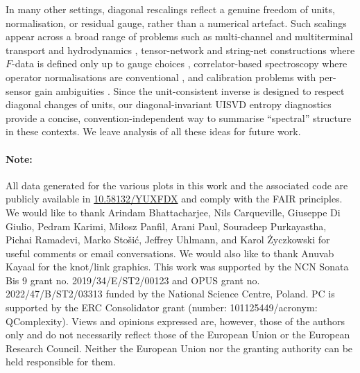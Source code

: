 \documentclass[11pt,a4paper]{article}
\begin{document}
In many other settings, diagonal rescalings reflect a genuine freedom of units, normalisation, or residual gauge, rather than a numerical artefact. Such scalings appear across a broad range of problems such as multi-channel and multiterminal transport and hydrodynamics \cite{Lucas2015HydrodynamicTransport,BrandnerSeifert2013Multiterminal,JacquodWhitneyMeairButtiker2012Tenfold,LucasDavisonSachdev2016WeylHydro}, tensor-network and string-net constructions where $F$-data is defined only up to gauge choices \cite{LevinWen2004StringNet,LanWen2013BulkEdgeStringNet,FrancuzLootensVerstraeteDziarmaga2021VariationalMPO}, correlator-based spectroscopy where operator normalisations are conventional \cite{DetmoldEndres2015SignalNoise,BlossierDellaMorteVonHippelMendesSommer2009GEVP}, and calibration problems with per-sensor gain ambiguities \cite{Smirnov2011RIME2}. Since the unit-consistent inverse is designed to respect diagonal changes of units, our diagonal-invariant UISVD entropy diagnostics provide a concise, convention-independent way to summarise ``spectral'' structure in these contexts. We leave analysis of all these ideas for future work.
\paragraph{Note:} All data generated for the various plots in this work and the associated code are publicly available in \href{https://doi.org/10.58132/YUXFDX}{10.58132/YUXFDX} and comply with the FAIR principles.
\acknowledgments
We would like to thank Arindam Bhattacharjee, Nils Carqueville, Giuseppe Di Giulio, Pedram Karimi, Mi{\l}osz Panfil, Arani Paul, Souradeep Purkayastha, Pichai Ramadevi, Marko Stošić, Jeffrey Uhlmann, and Karol {\.Z}yczkowski for useful comments or email conversations. We would also like to thank Anuvab Kayaal for the knot/link graphics. This work was supported by the NCN Sonata Bis 9 grant no. 2019/34/E/ST2/00123 and OPUS grant no. 2022/47/B/ST2/03313 funded by the National Science Centre, Poland. PC is supported by the ERC Consolidator grant (number: 101125449/acronym: QComplexity). Views and opinions expressed are, however, those of the authors only and do not necessarily reflect those of the European Union or the European Research Council. Neither the European Union nor the granting authority can be held responsible for them.
\appendix
\end{document}
